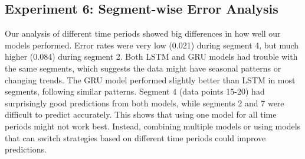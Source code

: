 \documentclass[conference]{IEEEtran}
\begin{document}
\subsection{Experiment 6: Segment-wise Error Analysis}
Our analysis of different time periods showed big differences in how well our models performed. Error rates were very low (0.021) during segment 4, but much higher (0.084) during segment 2. Both LSTM and GRU models had trouble with the same segments, which suggests the data might have seasonal patterns or changing trends. The GRU model performed slightly better than LSTM in most segments, following similar patterns. Segment 4 (data points 15-20) had surprisingly good predictions from both models, while segments 2 and 7 were difficult to predict accurately. This shows that using one model for all time periods might not work best. Instead, combining multiple models or using models that can switch strategies based on different time periods could improve predictions.
\end{document}
